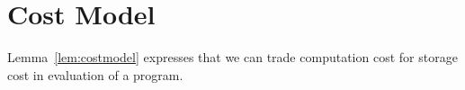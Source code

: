 \section{Cost Model}

Lemma~\ref{lem:costmodel} expresses that we can trade computation cost for
storage cost in evaluation of a \slang program. 






